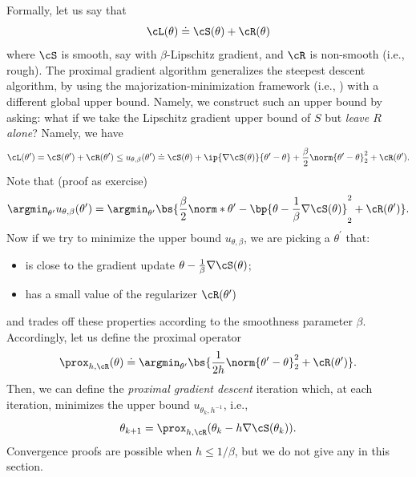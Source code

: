 \documentclass[../../book-main.tex]{subfiles}
\begin{document}
Formally, let us say that
\begin{equation}
    \cL(\theta) \doteq \cS(\theta) + \cR(\theta)
\end{equation}
where \(\cS\) is smooth, say with \(\beta\)-Lipschitz gradient, and
\(\cR\) is non-smooth (i.e., rough). The proximal gradient algorithm
generalizes the steepest descent algorithm, by using the
majorization-minimization framework (i.e.,
) with a different global upper
bound. Namely, we construct such an upper bound by asking: what if we
take the Lipschitz gradient upper bound of \(S\) but \textit{leave
\(R\) alone}?  Namely, we have
\begin{equation}
    \cL(\theta^{\prime}) = \cS(\theta^{\prime}) +
    \cR(\theta^{\prime}) \leq u_{\theta, \beta}(\theta^{\prime})
    \doteq \cS(\theta) + \ip{\nabla \cS(\theta)}{\theta^{\prime} -
    \theta} + \frac{\beta}{2}\norm{\theta^{\prime} - \theta}_{2}^{2}
    + \cR(\theta^{\prime}).
\end{equation}
Note that (proof as exercise)
\begin{equation}
    \argmin_{\theta^{\prime}}u_{\theta, \beta}(\theta^{\prime}) =
    \argmin_{\theta^{\prime}}\bs{\frac{\beta}{2}\norm*{\theta^{\prime}
        - \bp{\theta - \frac{1}{\beta}\nabla \cS(\theta)}}_{2}^{2} +
    \cR(\theta^{\prime})}.
\end{equation}
Now if we try to minimize the upper bound \(u_{\theta, \beta}\), we
are picking a \(\theta^{\prime}\) that:
\begin{itemize}
    \item is close to the gradient update \(\theta -
        \frac{1}{\beta}\nabla \cS(\theta)\);
    \item has a small value of the regularizer \(\cR(\theta^{\prime})\)
\end{itemize}
and trades off these properties according to the smoothness parameter
\(\beta\). Accordingly, let us define the proximal operator
\begin{equation}
    \prox_{h, \cR}(\theta) \doteq
    \argmin_{\theta^{\prime}}\bs{\frac{1}{2h}\norm{\theta^{\prime} -
    \theta}_{2}^{2} + \cR(\theta^{\prime})}.
\end{equation}
Then, we can define the \textit{proximal gradient descent} iteration
which, at each iteration, minimizes the upper bound \(u_{\theta_{k},
h^{-1}}\), i.e.,
\begin{equation}
    \theta_{k + 1} = \prox_{h, \cR}(\theta_{k} - h\nabla \cS(\theta_{k})).
\end{equation}
Convergence proofs are possible when \(h \leq 1/\beta\), but we do
not give any in this section.
\end{document}
